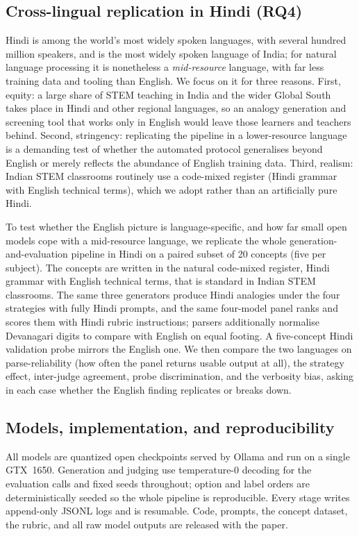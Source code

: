 \documentclass[11pt]{article}
\begin{document}
\subsection{Cross-lingual replication in Hindi (RQ4)}
\label{sec:method:hindi}
Hindi is among the world's most widely spoken languages, with several hundred million speakers, and
is the most widely spoken language of India; for natural language processing it is nonetheless a
\emph{mid-resource} language, with far less training data and tooling than English. We focus on it
for three reasons. First, equity: a large share of STEM teaching in India and the wider Global South
takes place in Hindi and other regional languages, so an analogy generation and screening tool that
works only in English would leave those learners and teachers behind. Second, stringency: replicating
the pipeline in a lower-resource language is a demanding test of whether the automated protocol
generalises beyond English or merely reflects the abundance of English training data. Third, realism:
Indian STEM classrooms routinely use a code-mixed register (Hindi grammar with English technical
terms), which we adopt rather than an artificially pure Hindi.

To test whether the English picture is language-specific, and how far small open models cope
with a mid-resource language, we replicate the whole generation-and-evaluation pipeline in
Hindi on a paired subset of 20 concepts (five per subject). The concepts are written in the
natural code-mixed register, Hindi grammar with English technical terms, that is standard in
Indian STEM classrooms. The same three generators produce Hindi analogies under the four
strategies with fully Hindi prompts, and the same four-model panel ranks and scores them with
Hindi rubric instructions; parsers additionally normalise Devanagari digits to compare with
English on equal footing. A five-concept Hindi validation probe mirrors the English one. We
then compare the two languages on parse-reliability (how often the panel returns usable
output at all), the strategy effect, inter-judge agreement, probe discrimination, and the
verbosity bias, asking in each case whether the English finding replicates or breaks down.

\subsection{Models, implementation, and reproducibility}
\label{sec:method:impl}
All models are quantized open checkpoints served by Ollama and run on a single
GTX~1650. Generation and judging use temperature-0 decoding for the evaluation
calls and fixed seeds throughout; option and label orders are deterministically
seeded so the whole pipeline is reproducible. Every stage writes append-only
JSONL logs and is resumable. Code, prompts, the concept dataset, the rubric, and
all raw model outputs are released with the paper.
\end{document}
